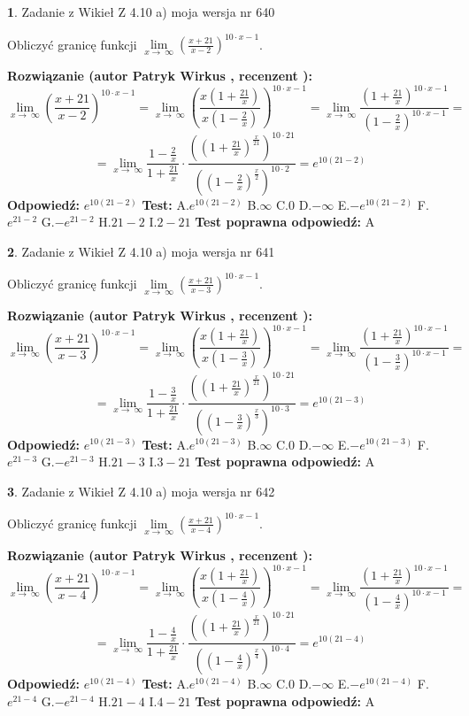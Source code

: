 \documentclass[12pt, a4paper]{article}
\theoremstyle{definition} %
\newtheorem{zad}{}
\newcommand{\zadStart}[1]{\begin{zad}#1\newline}
\newcommand{\zadStop}{\end{zad}}
\newcommand{\rozwStart}[2]{\noindent \textbf{Rozwiązanie (autor #1 , recenzent #2): }\newline}
\newcommand{\rozwStop}{\newline}
\newcommand{\odpStart}{\noindent \textbf{Odpowiedź:}\newline}
\newcommand{\odpStop}{\newline}
\newcommand{\testStart}{\noindent \textbf{Test:}\newline}
\newcommand{\testStop}{\newline}
\newcommand{\kluczStart}{\noindent \textbf{Test poprawna odpowiedź:}\newline}
\newcommand{\kluczStop}{\newline}
\begin{document}
\zadStart{Zadanie z Wikieł Z 4.10 a) moja wersja nr 640}


Obliczyć granicę funkcji  $\lim\limits_{x\to\ \infty}(\frac{x+21}{x-2})^{10\cdot x-1}$.
\zadStop
\rozwStart{Patryk Wirkus}{}
$$\lim\limits_{x\to\ \infty}(\frac{x+21}{x-2})^{10\cdot x-1} = \lim\limits_{x\to\ \infty}(\frac{x(1+\frac{21}{x})}{x(1-\frac{2}{x})})^{10\cdot x-1}=\lim\limits_{x\to\ \infty}\frac{(1+\frac{21}{x})^{10\cdot x-1}}{(1-\frac{2}{x})^{10\cdot x-1}}=$$
$$=\lim\limits_{x\to\ \infty}\frac{1-\frac{2}{x}}{1+\frac{21}{x}}\cdot\frac{((1+\frac{21}{x})^{\frac{x}{21}})^{10\cdot21}}{((1-\frac{2}{x})^{\frac{x}{2}})^{10\cdot2}}=e^{10(21-2)}$$
\rozwStop
\odpStart
$e^{10(21-2)}$
\odpStop
\testStart
A.$e^{10(21-2)}$ B.$\infty$ C.$0$ D.$-\infty$ E.$-e^{10(21-2)}$
F.$e^{21-2}$ G.$-e^{21-2}$
H.$21-2$
I.$2-21$
\testStop
\kluczStart
A
\kluczStop



\zadStart{Zadanie z Wikieł Z 4.10 a) moja wersja nr 641}


Obliczyć granicę funkcji  $\lim\limits_{x\to\ \infty}(\frac{x+21}{x-3})^{10\cdot x-1}$.
\zadStop
\rozwStart{Patryk Wirkus}{}
$$\lim\limits_{x\to\ \infty}(\frac{x+21}{x-3})^{10\cdot x-1} = \lim\limits_{x\to\ \infty}(\frac{x(1+\frac{21}{x})}{x(1-\frac{3}{x})})^{10\cdot x-1}=\lim\limits_{x\to\ \infty}\frac{(1+\frac{21}{x})^{10\cdot x-1}}{(1-\frac{3}{x})^{10\cdot x-1}}=$$
$$=\lim\limits_{x\to\ \infty}\frac{1-\frac{3}{x}}{1+\frac{21}{x}}\cdot\frac{((1+\frac{21}{x})^{\frac{x}{21}})^{10\cdot21}}{((1-\frac{3}{x})^{\frac{x}{3}})^{10\cdot3}}=e^{10(21-3)}$$
\rozwStop
\odpStart
$e^{10(21-3)}$
\odpStop
\testStart
A.$e^{10(21-3)}$ B.$\infty$ C.$0$ D.$-\infty$ E.$-e^{10(21-3)}$
F.$e^{21-3}$ G.$-e^{21-3}$
H.$21-3$
I.$3-21$
\testStop
\kluczStart
A
\kluczStop



\zadStart{Zadanie z Wikieł Z 4.10 a) moja wersja nr 642}


Obliczyć granicę funkcji  $\lim\limits_{x\to\ \infty}(\frac{x+21}{x-4})^{10\cdot x-1}$.
\zadStop
\rozwStart{Patryk Wirkus}{}
$$\lim\limits_{x\to\ \infty}(\frac{x+21}{x-4})^{10\cdot x-1} = \lim\limits_{x\to\ \infty}(\frac{x(1+\frac{21}{x})}{x(1-\frac{4}{x})})^{10\cdot x-1}=\lim\limits_{x\to\ \infty}\frac{(1+\frac{21}{x})^{10\cdot x-1}}{(1-\frac{4}{x})^{10\cdot x-1}}=$$
$$=\lim\limits_{x\to\ \infty}\frac{1-\frac{4}{x}}{1+\frac{21}{x}}\cdot\frac{((1+\frac{21}{x})^{\frac{x}{21}})^{10\cdot21}}{((1-\frac{4}{x})^{\frac{x}{4}})^{10\cdot4}}=e^{10(21-4)}$$
\rozwStop
\odpStart
$e^{10(21-4)}$
\odpStop
\testStart
A.$e^{10(21-4)}$ B.$\infty$ C.$0$ D.$-\infty$ E.$-e^{10(21-4)}$
F.$e^{21-4}$ G.$-e^{21-4}$
H.$21-4$
I.$4-21$
\testStop
\kluczStart
A
\kluczStop
\end{document}
